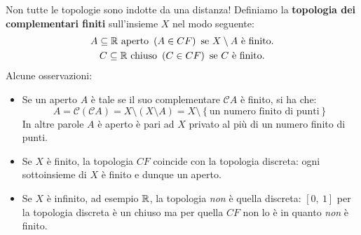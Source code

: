 \begin{attention}
Non tutte le topologie sono indotte da una distanza! Definiamo la \textbf{topologia dei complementari finiti} sull'insieme $X$ nel modo seguente:
\begin{gather*}
	A\subseteq \mathbb{R} \text{ aperto } \left(A\in CF\right) \text{ se }  X\setminus A \text{ è finito.}\\
	C\subseteq \mathbb{R} \text{ chiuso } \left(C\in CF\right) \text{ se }  C \text{ è finito.}
\end{gather*}
Alcune osservazioni:
\begin{itemize}
	\item Se un aperto $A$ è tale se il suo complementare $\mathcal{C}A$ è finito, si ha che:
	\begin{equation}
		A=\mathcal{C}\left(\mathcal{C}A\right)=X\setminus\left(X\setminus A\right)=X\setminus\left\{\text{un numero finito di punti}\right\}
	\end{equation}
	In altre parole $A$ è aperto è pari ad $X$ privato al più di un numero finito di punti.
	\item Se $X$ è finito, la topologia $CF$ coincide con la topologia discreta: ogni sottoinsieme di $X$ è finito e dunque un aperto.
	\item Se $X$ è infinito, ad esempio $\mathbb{R}$, la topologia \textit{non} è quella discreta: $[0,\ 1]$ per la topologia discreta è un chiuso ma per quella $CF$ non lo è in quanto \textit{non} è finito.
\end{itemize}
\end{attention}

